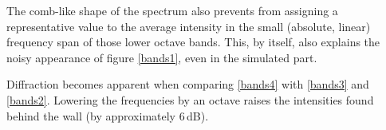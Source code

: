 The comb-like shape of the spectrum also prevents from assigning a representative value to the average intensity in the small (absolute, linear) frequency span of those lower octave bands. This, by itself, also explains the noisy appearance of figure \ref{bands1}, even in the simulated part.

Diffraction becomes apparent when comparing \ref{bands4} with \ref{bands3} and \ref{bands2}. Lowering the frequencies by an octave raises the intensities found behind the wall (by approximately 6\,dB).







